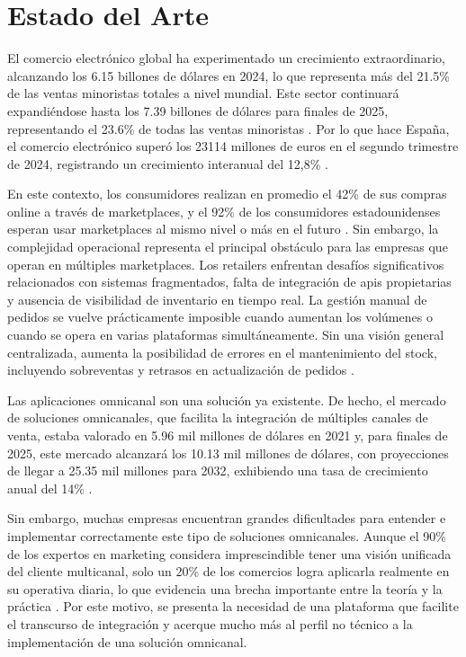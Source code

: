 \section{Estado del Arte}
\label{intro:sec:estado_arte}

El comercio electrónico global ha experimentado un crecimiento extraordinario, alcanzando los 6.15 billones de dólares en 2024, lo que representa más del 21.5\% de las ventas minoristas totales a nivel mundial. Este sector continuará expandiéndose hasta los 7.39 billones de dólares para finales de 2025, representando el 23.6\% de todas las ventas minoristas \cite{ea_bluehost}. Por lo que hace España, el comercio electrónico superó los 23114 millones de euros en el segundo trimestre de 2024, registrando un crecimiento interanual del 12,8\% \cite{ea_cnmc}.

En este contexto, los consumidores realizan en promedio el 42\% de sus compras online a través de marketplaces, y el 92\% de los consumidores estadounidenses esperan usar marketplaces al mismo nivel o más en el futuro \cite{ea_future}. Sin embargo, la complejidad operacional representa el principal obstáculo para las empresas que operan en múltiples marketplaces. Los retailers enfrentan desafíos significativos relacionados con sistemas fragmentados, falta de integración de \gls{api}s propietarias y ausencia de visibilidad de inventario en tiempo real. La gestión manual de pedidos se vuelve prácticamente imposible cuando aumentan los volúmenes o cuando se opera en varias plataformas simultáneamente. Sin una visión general centralizada, aumenta la posibilidad de errores en el mantenimiento del stock, incluyendo sobreventas y retrasos en actualización de pedidos \cite{ea_volo}.

Las aplicaciones omnicanal son una solución ya existente. De hecho, el mercado de soluciones omnicanales, que facilita la integración de múltiples canales de venta, estaba valorado en 5.96 mil millones de dólares en 2021 y, para finales de 2025, este mercado alcanzará los 10.13 mil millones de dólares, con proyecciones de llegar a 25.35 mil millones para 2032, exhibiendo una tasa de crecimiento anual del 14\% \cite{ea_grandview}\cite{ea_coherent}.

Sin embargo, muchas empresas encuentran grandes dificultades para entender e implementar correctamente este tipo de soluciones omnicanales. Aunque el 90\% de los expertos en marketing considera imprescindible tener una visión unificada del cliente multicanal, solo un 20\% de los comercios logra aplicarla realmente en su operativa diaria, lo que evidencia una brecha importante entre la teoría y la práctica \cite{ea_adyen}. Por este motivo, se presenta la necesidad de una plataforma que facilite el transcurso de integración y acerque mucho más al perfil no técnico a la implementación de una solución omnicanal.